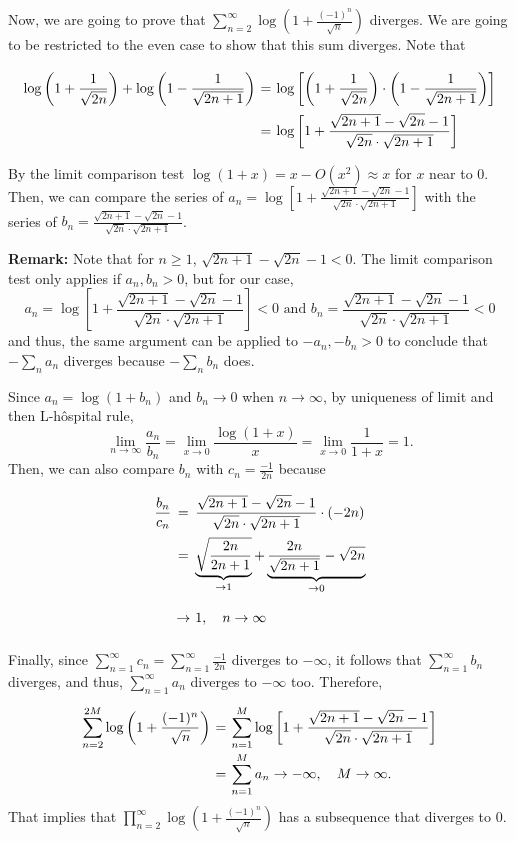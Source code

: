Now, we are going to prove that $\sum_{n = 2}^{\infty}\log\left( 1+\frac{(-1)^n}{\sqrt{n}} \right)$ diverges. We are going to be restricted to the even case to show that this sum diverges. Note that
\[ \everymath{\displaystyle}
\arraycolsep=1.8pt\def\arraystretch{2.5}
\begin{array}{rcl}
    \log\left( 1+\frac{1}{\sqrt{2n}} \right) +  \log\left( 1-\frac{1}{\sqrt{2n+1}} \right) & = & \log \left[ \left( 1+\frac{1}{\sqrt{2n}} \right) \cdot \left( 1-\frac{1}{\sqrt{2n+1}} \right) \right]\\
    & = & \log\left[1 + \frac{\sqrt{2n+1}-\sqrt{2n}-1}{\sqrt{2n} \cdot \sqrt{2n+1}} \right]
\end{array} \]

By the limit comparison test $\log(1+x) = x - O(x^{2}) \approx x$ for $x$ near to 0. Then, we can compare the series of $ a_n = \log\left[1 + \frac{\sqrt{2n+1}-\sqrt{2n}-1}{\sqrt{2n} \cdot \sqrt{2n+1}} \right]$ with the series of $b_n = \frac{\sqrt{2n+1}-\sqrt{2n}-1}{\sqrt{2n} \cdot \sqrt{2n+1}}$. 

\textbf{Remark:} Note that for $n \geq 1$, $\sqrt{2n+1}-\sqrt{2n}-1 < 0 $. The limit comparison test only applies if $a_n, b_n > 0$, but for our case,
\[ a_n = \log\left[1 + \frac{\sqrt{2n+1}-\sqrt{2n}-1}{\sqrt{2n} \cdot \sqrt{2n+1}} \right] < 0 \mbox{ and } b_n = \frac{\sqrt{2n+1}-\sqrt{2n}-1}{\sqrt{2n} \cdot \sqrt{2n+1}} < 0 \]
and thus, the same argument can be applied to $-a_n, -b_n > 0$ to conclude that $-\sum_n a_n$ diverges because $-\sum_n b_n$ does.

Since $a_n = \log(1+b_n)$ and $b_n \to 0$ when $n\to \infty$, by uniqueness of limit and then L-hôspital rule,
\[ \lim_{n\to\infty} \frac{a_n}{b_n} = \lim_{x\to 0} \frac{\log(1+x)}{x} = \lim_{x\to 0} \frac{1}{1+x} = 1. \]
Then, we can also compare $b_n$ with $c_n = \frac{-1}{2n}$ because
\[ \everymath{\displaystyle}
\arraycolsep=1.8pt\def\arraystretch{2.5}
\begin{array}{rcl}
    \frac{b_n}{c_n} & = & \frac{\sqrt{2n+1}-\sqrt{2n}-1}{\sqrt{2n} \cdot \sqrt{2n+1}} \cdot (-2n) \\
    & = & \underbrace{\sqrt{\frac{2n}{2n+1}}}_{\to 1} + \underbrace{\frac{2n}{\sqrt{2n+1}} - \sqrt{2n}}_{\to 0}\\
    & \to & 1,\quad n\to \infty
\end{array} \]

Finally, since $\sum_{n = 1}^{\infty} c_n = \sum_{n = 1}^{\infty} \frac{-1}{2n} $ diverges to $-\infty$, it follows that $\sum_{n = 1}^{\infty} b_n$ diverges, and thus, $\sum_{n = 1}^{\infty} a_n$ diverges to $-\infty$ too. Therefore,
\[ \everymath{\displaystyle}
\arraycolsep=1.8pt\def\arraystretch{2.5}
\begin{array}{rcl}
    \sum_{n = 2}^{2M}\log\left( 1+\frac{(-1)^n}{\sqrt{n}} \right) & = & \sum_{n = 1}^{M} \log\left[1 + \frac{\sqrt{2n+1}-\sqrt{2n}-1}{\sqrt{2n} \cdot \sqrt{2n+1}} \right]\\
     & = & \sum_{n = 1}^{M} a_n \to -\infty,\quad M \to \infty.
\end{array}  \]
That implies that $\prod_{n = 2}^{\infty} \log\left( 1+\frac{(-1)^n}{\sqrt{n}} \right)$ has a subsequence that diverges to 0.
